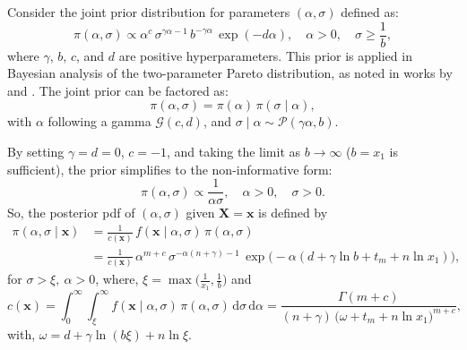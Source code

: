 \documentclass[twoside]{article}
\begin{document}
Consider the joint prior distribution for parameters $(\alpha, \sigma)$ defined as:
\[
\pi(\alpha, \sigma) \propto \alpha^c\, \sigma^{\gamma\alpha - 1}\, b^{-\gamma\alpha}\,\exp(-d\alpha), \quad \alpha > 0, \quad \sigma\ge \frac{1}{b},
\]
where $\gamma$, $b$, $c$, and $d$ are positive hyperparameters. This prior is applied in Bayesian analysis of the two-parameter Pareto distribution, as noted in works by \cite{Arnold-Press} and \cite{Lwin}. The joint prior can be factored as:
\[
\pi(\alpha, \sigma) = \pi(\alpha) \, \pi(\sigma \mid \alpha),
\]
with $\alpha$ following a gamma $\mathcal{G}(c,d)$, and $\sigma \mid \alpha \sim \mathcal{P}(\gamma\alpha, b)$.

By setting $\gamma = d=0$, $c = -1$, and taking the limit as $b \to \infty$ ($b=x_1$ is sufficient), the prior simplifies to the non-informative form:
\[
\pi(\alpha, \sigma) \propto \frac{1}{\alpha \sigma}, \quad \alpha > 0, \quad \sigma > 0.
\]
So, the posterior pdf of $(\alpha,\sigma)$ given $\mathbf{X}=\mathbf{x}$ is defined by
%
\begin{align}
	\mathcal{\pi}(\alpha,\sigma\mid\mathbf{x})&=\frac{1}{c(\mathbf{x})}\,f(\mathbf{x}\mid\alpha,\sigma)\,\mathcal{\pi}(\alpha,\sigma)\nonumber\\
	&=\frac{1}{c(\mathbf{x})}\,\alpha^{m+c}\,\sigma^{-\alpha(n+ \gamma)-1}\,\exp\big(-\alpha(d+\gamma\ln b+t_m+n\ln x_1)\big),\label{posterior-pdf}
\end{align}
for $\sigma>\xi,~\alpha>0$, where, $\xi=\max\big(\frac{1}{x_1},\frac{1}{b}\big)$ and
\[
c(\mathbf{x})=\int_{0}^{\infty}\int_{\xi}^{\infty}f(\mathbf{x}\mid\alpha,\sigma)\,\mathcal{\pi}(\alpha,\sigma)\,\mathrm{d}\sigma\,\mathrm{d}\alpha=\frac{\Gamma(m+c)}{(n+\gamma)\,\big(\omega+t_m+n\ln x_1\big)^{m+c}},
\]
with, $\omega=d+\gamma\ln (b\xi)+n\ln\xi$.
%
\end{document}
